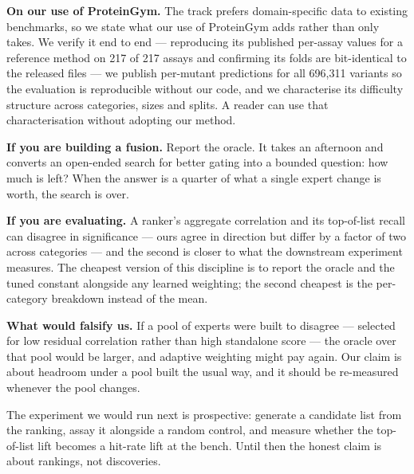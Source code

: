 \documentclass[sigconf,review,nonacm]{acmart}
\begin{document}
\textbf{On our use of ProteinGym.} The track prefers domain-specific data to existing benchmarks, so we state
what our use of ProteinGym adds rather than only takes. We verify it end to end --- reproducing its
published per-assay values for a reference method on 217 of 217 assays and confirming its folds are
bit-identical to the released files --- we publish per-mutant predictions for all 696,311 variants so the
evaluation is reproducible without our code, and we characterise its difficulty structure across
categories, sizes and splits. A reader can use that characterisation without adopting our method.

\textbf{If you are building a fusion.} Report the oracle. It takes an afternoon and converts an open-ended
search for better gating into a bounded question: how much is left? When the answer is a quarter of what
a single expert change is worth, the search is over.

\textbf{If you are evaluating.} A ranker's aggregate correlation and its top-of-list recall can disagree in
significance --- ours agree in direction but differ by a factor of two across categories --- and the second
is closer to what the downstream experiment measures. The cheapest version of this discipline is to
report the oracle and the tuned constant alongside any learned weighting; the second cheapest is the
per-category breakdown instead of the mean.

\textbf{What would falsify us.} If a pool of experts were built to disagree --- selected for low residual
correlation rather than high standalone score --- the oracle over that pool would be larger, and adaptive
weighting might pay again. Our claim is about headroom under a pool built the usual way, and it should be
re-measured whenever the pool changes.

The experiment we would run next is prospective: generate a candidate list from the ranking, assay it
alongside a random control, and measure whether the top-of-list lift becomes a hit-rate lift at the
bench. Until then the honest claim is about rankings, not discoveries.




\end{document}
